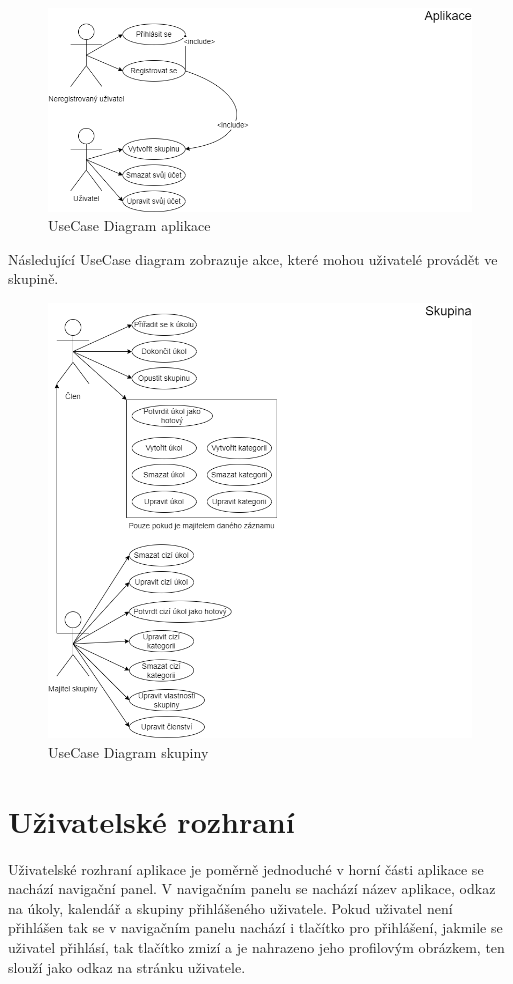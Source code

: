 \begin{figure}[hbt!]
	\includegraphics[width=0.8\linewidth]{img/UseCaseAplikace.png}
	\caption{UseCase Diagram aplikace}
\end{figure}

Následující UseCase diagram zobrazuje akce, které mohou uživatelé provádět ve skupině.
\begin{figure}[hbt!]
	\includegraphics[height=0.7\textwidth]{img/UseCaseSkupina.png}
	\caption{UseCase Diagram skupiny}
\end{figure}
\clearpage
\section{Uživatelské rozhraní}
Uživatelské rozhraní aplikace je poměrně jednoduché v horní části aplikace se nachází navigační panel. V navigačním panelu se nachází název aplikace, odkaz na úkoly, kalendář a skupiny přihlášeného uživatele. Pokud uživatel není přihlášen tak se v navigačním panelu nachází i tlačítko pro přihlášení, jakmile se uživatel přihlásí, tak tlačítko zmizí a je nahrazeno jeho profilovým obrázkem, ten slouží jako odkaz na stránku uživatele. 

